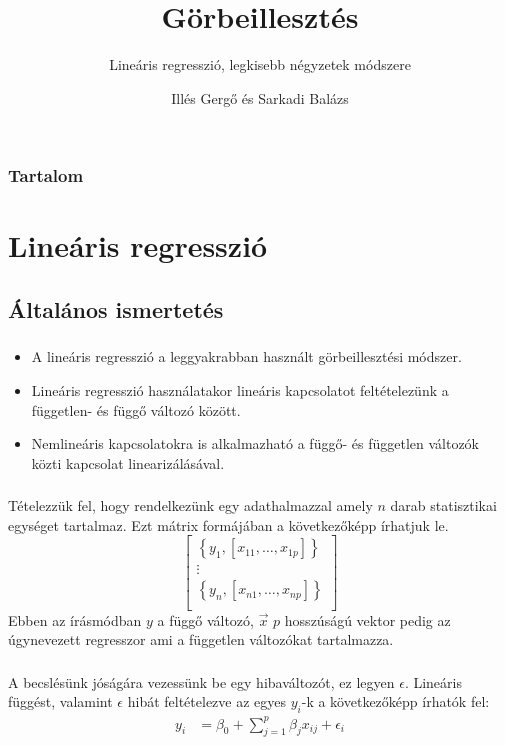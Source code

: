 \documentclass{beamer}
\title{Görbeillesztés}
\subtitle{Lineáris regresszió, legkisebb négyzetek módszere}
\author{Illés Gergő és Sarkadi Balázs}
\institute{PTE TTK Fizikai Intézet}
\begin{document}
\begin{frame}
\titlepage
\end{frame}
\begin{frame}
\frametitle{Tartalom}
\tableofcontents
\end{frame}
\section{Lineáris regresszió}
\subsection{Általános ismertetés}
\begin{frame}
\frametitle{\subsecname}
\begin{itemize}
\item A lineáris regresszió a leggyakrabban használt görbeillesztési módszer.
\item Lineáris regresszió használatakor lineáris kapcsolatot feltételezünk a független\hyp{} és függő változó között.
\item Nemlineáris kapcsolatokra is alkalmazható a függő\hyp{} és független változók közti kapcsolat linearizálásával.
\end{itemize}
\end{frame}
\begin{frame}
\frametitle{\subsecname}
Tételezzük fel, hogy rendelkezünk egy adathalmazzal amely $n$ darab statisztikai egységet tartalmaz. Ezt mátrix formájában a következőképp írhatjuk le.
\begin{equation*}
\left[
\begin{matrix}
\left\lbrace y_1,[x_{11},\dots,x_{1p}]\right\rbrace\\
\vdots\\
\left\lbrace y_n,[x_{n1},\dots,x_{np}]\right\rbrace\\
\end{matrix}
\right]
\end{equation*}
Ebben az írásmódban $y$ a függő változó, $\vec{x}$ $p$ hosszúságú vektor pedig az úgynevezett regresszor ami a független változókat tartalmazza.
\end{frame}
\begin{frame}
\frametitle{\subsecname}
A becslésünk jóságára vezessünk be egy hibaváltozót, ez legyen $\epsilon$. Lineáris függést, valamint $\epsilon$ hibát feltételezve az egyes $y_i$-k a következőképp írhatók fel:
\begin{align*}
y_i&=\beta_0+\sum_{j=1}^{p}\beta_jx_{ij}+\epsilon_i
\end{align*}
\end{frame}
\end{document}
